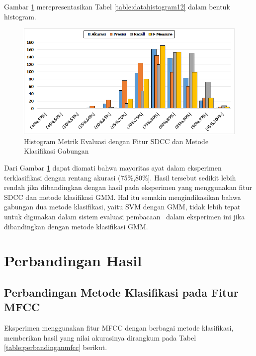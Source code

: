   Gambar \ref{fig:histogram12} merepresentasikan Tabel \ref{table:datahistogram12} dalam bentuk histogram.
  \begin{figure}
    \centering
    \includegraphics[width=\linewidth]{pics/histogram12}
    \caption{Histogram Metrik Evaluasi dengan Fitur SDCC dan Metode Klasifikasi Gabungan}
    \label{fig:histogram12}
  \end{figure}

  Dari Gambar \ref{fig:histogram12} dapat diamati bahwa mayoritas ayat dalam eksperimen terklasifikasi dengan rentang akurasi (75\%,80\%]. Hasil tersebut sedikit lebih rendah jika dibandingkan dengan hasil pada eksperimen yang menggunakan fitur SDCC dan metode klasifikasi GMM. Hal itu semakin mengindikasikan bahwa gabungan dua metode klasifikasi, yaitu SVM dengan GMM, tidak lebih tepat untuk digunakan dalam sistem evaluasi pembacaan \quran~dalam eksperimen ini jika dibandingkan dengan metode klasifikasi GMM.

















\section{Perbandingan Hasil}

  \subsection{Perbandingan Metode Klasifikasi pada Fitur MFCC}
  Eksperimen menggunakan fitur MFCC dengan berbagai metode klasifikasi, memberikan hasil yang nilai akurasinya dirangkum pada Tabel \ref{table:perbandinganmfcc} berikut.
  
